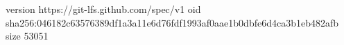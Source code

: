 version https://git-lfs.github.com/spec/v1
oid sha256:046182c63576389df1a3a11e6d76fdf1993af0aae1b0dbfe6d4ca3b1eb482afb
size 53051
